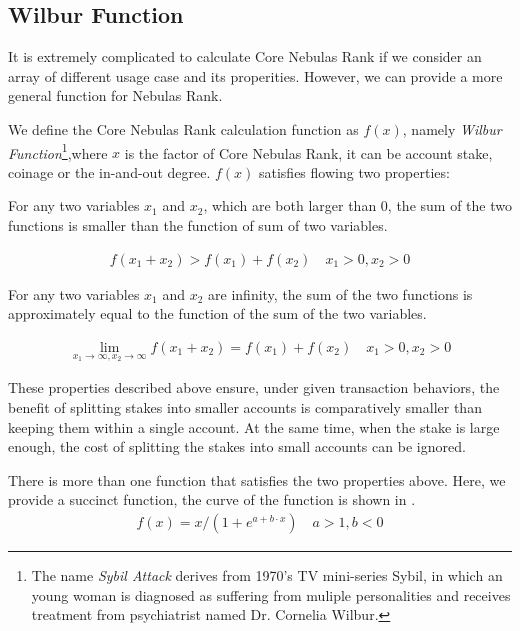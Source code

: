 \subsection{Wilbur Function \label{sec:function}}
It is extremely complicated to calculate Core Nebulas Rank if we consider an array of different usage case and its properities. However, we can provide a more general function for Nebulas Rank.

We define the Core Nebulas Rank calculation function as \(f(x)\), namely \emph{Wilbur Function}\footnote{The name \emph{Sybil Attack} derives from 1970's TV mini-series Sybil, in which an young woman is diagnosed as suffering from muliple personalities and receives treatment from psychiatrist named Dr. Cornelia Wilbur.},where \(x\) is the factor of Core Nebulas Rank, it can be account stake, coinage or the in-and-out degree. $f(x)$ satisfies flowing two properties:

\begin{property}
\label{prop:one}
For any two variables $x_1$ and $x_2$, which are both larger than $0$, the sum of the two functions is smaller than the function of sum of two variables.
\end{property}

\begin{align}
f(x_1+x_2)>f(x_1)+f(x_2) \quad x_1>0,x_2>0
\end{align}

\begin{property}
\label{prop:two}
For any two variables $x_1$ and $x_2$ are infinity, the sum of the two functions is approximately equal to the function of the sum of the two variables.
\end{property}

\begin{align}
\lim\limits_{x_1 \to \infty, x_2\to \infty} f(x_1+x_2) = f(x_1) + f(x_2)\quad x_1>0, x_2>0
\end{align}

These properties described above ensure, under given transaction behaviors, the benefit of splitting stakes into smaller accounts is comparatively smaller than keeping them within a single account. At the same time, when the stake is large enough, the cost of splitting the stakes into small accounts can be ignored.

There is more than one function that satisfies the two properties above. Here, we provide a succinct function, the curve of the function is shown in .
\begin{align}
f(x) = x/(1 + e^{a + b\cdot x}) \quad a>1,b<0
\end{align}

